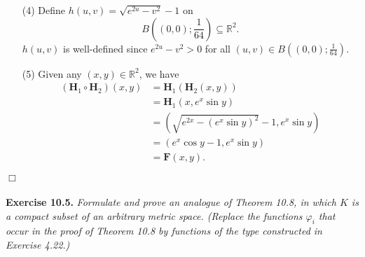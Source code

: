 \documentclass{article}
\begin{document}
\begin{enumerate}
\item[(4)]
  Define $h(u,v) = \sqrt{e^{2u} - v^{2}} - 1$ on
  \[
    B\left((0,0);\frac{1}{64}\right) \subseteq \mathbb{R}^2.
  \]
  $h(u,v)$ is well-defined since $e^{2u}-v^2 > 0$
  for all $(u,v) \in B\left((0,0);\frac{1}{64}\right)$.

\item[(5)]
  Given any $(x,y) \in \mathbb{R}^2$, we have
  \begin{align*}
    (\mathbf{H}_1 \circ \mathbf{H}_2)(x,y)
    &= \mathbf{H}_1(\mathbf{H}_2(x,y)) \\
    &= \mathbf{H}_1(x, e^x \sin y) \\
    &= (\sqrt{e^{2x} - (e^x \sin y)^2} - 1, e^x \sin y) \\
    &= (e^x \cos y - 1, e^x \sin y) \\
    &= \mathbf{F}(x,y).
  \end{align*}

\end{enumerate}
$\Box$ \\\\






\textbf{Exercise 10.5.}
\emph{Formulate and prove an analogue of Theorem 10.8,
in which $K$ is a compact subset of an arbitrary metric space.
(Replace the functions $\varphi_i$ that occur in the proof of Theorem 10.8
by functions of the type constructed in Exercise 4.22.)} \\
\end{document}
